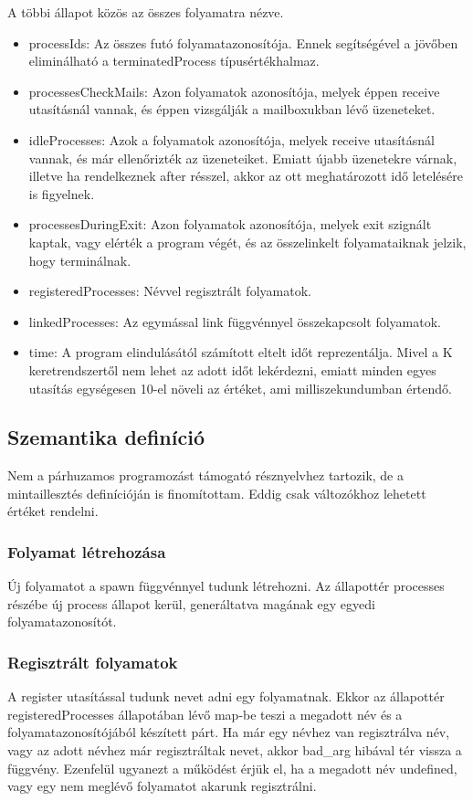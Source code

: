\documentclass[]{article}
\begin{document}
A többi állapot közös az összes folyamatra nézve.

\begin{itemize}
\item processIds: Az összes futó folyamatazonosítója. Ennek segítségével a jövőben eliminálható a terminatedProcess típusértékhalmaz.
\item processesCheckMails: Azon folyamatok azonosítója, melyek éppen receive utasításnál vannak, és éppen vizsgálják a mailboxukban lévő üzeneteket.
\item idleProcesses: Azok a folyamatok azonosítója, melyek receive utasításnál vannak, és már ellenőrizték az üzeneteiket. Emiatt újabb üzenetekre várnak, illetve ha rendelkeznek after résszel, akkor az ott meghatározott idő letelésére is figyelnek.
\item processesDuringExit: Azon folyamatok azonosítója, melyek exit szignált kaptak, vagy elérték a program végét, és az összelinkelt folyamataiknak jelzik, hogy terminálnak.
\item registeredProcesses: Névvel regisztrált folyamatok.
\item linkedProcesses: Az egymással link függvénnyel összekapcsolt folyamatok.
\item time: A program elindulásától számított eltelt időt reprezentálja. Mivel a K keretrendszertől nem lehet az adott időt lekérdezni, emiatt minden egyes utasítás egységesen 10-el növeli az értéket, ami milliszekundumban értendő.
\end{itemize}


\subsection*{Szemantika definíció}
Nem a párhuzamos programozást támogató résznyelvhez tartozik, de a mintaillesztés definícióján is finomítottam. Eddig csak változókhoz lehetett értéket rendelni.

\subsubsection*{Folyamat létrehozása}
Új folyamatot a spawn függvénnyel tudunk létrehozni. Az állapottér processes részébe új process állapot kerül, generáltatva magának egy egyedi folyamatazonosítót.

\subsubsection*{Regisztrált folyamatok}
A register utasítással tudunk nevet adni egy folyamatnak. Ekkor az állapottér registeredProcesses állapotában lévő map-be teszi a megadott név és a folyamatazonosítójából készített párt. Ha már egy névhez van regisztrálva név, vagy az adott névhez már regisztráltak nevet, akkor bad\_arg hibával tér vissza a függvény. Ezenfelül ugyanezt a működést érjük el, ha a megadott név undefined, vagy egy nem meglévő folyamatot akarunk regisztrálni.
\end{document}
